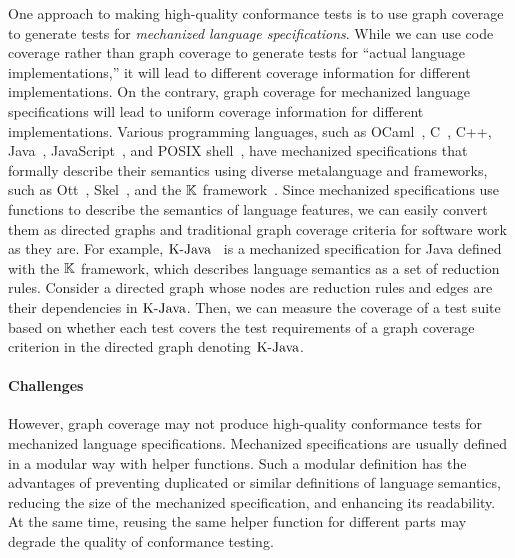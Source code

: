 
One approach to making high-quality conformance tests is to use graph coverage
to generate tests for \textit{mechanized language specifications}.
%
While we can use code coverage rather than graph coverage
to generate tests for ``actual language implementations,''
it will lead to different coverage information for different implementations.
On the contrary, graph coverage for mechanized language specifications
will lead to uniform coverage information for different implementations.
%
Various programming languages, such as OCaml~\cite{ocaml-light-spec},
C~\cite{c-light-spec}, C++\cite{cpp-spec}, Java~\cite{k-java},
JavaScript~\cite{jiset}, and POSIX shell~\cite{posix-shell-spec},
have mechanized specifications that formally describe their
semantics using diverse metalanguage and frameworks, such as Ott~\cite{ott}, Skel~\cite{skel}, and the
$\mathbb{K}$ framework~\cite{kframework}.
%
Since mechanized specifications use functions to describe the semantics of language features,
we can easily convert them as directed graphs and traditional graph coverage
criteria for software work as they are.
For example, $\text{K-Java}$~\cite{k-java} is a mechanized specification for Java
defined with the $\mathbb{K}$ framework, which describes language semantics
as a set of reduction rules.
Consider a directed graph whose nodes are reduction rules and edges are
their dependencies in $\text{K-Java}$.
Then, we can measure the coverage of a test suite based on whether each test
covers the test requirements of a graph coverage criterion in the directed graph
denoting $\text{K-Java}$.


\paragraph{\textbf{Challenges}}
However, graph coverage may not produce high-quality conformance tests
for mechanized language specifications.
Mechanized specifications are usually defined in a modular way with helper functions.
Such a modular definition has the advantages of preventing duplicated or similar
definitions of language semantics, reducing the size of the mechanized
specification, and enhancing its readability.
At the same time, reusing the same helper function for different parts
may degrade the quality of conformance testing.


